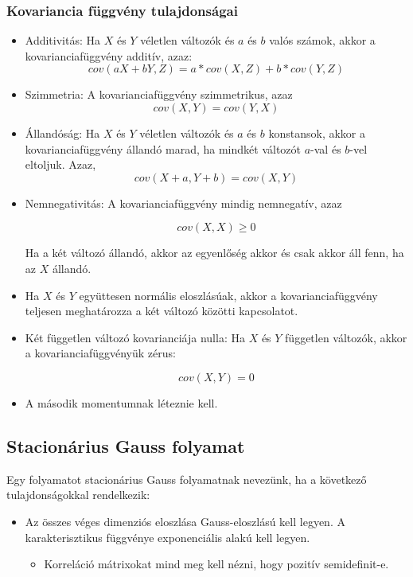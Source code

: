 \documentclass[11pt,a4paper]{article}
\begin{document}
				\subsubsection{Kovariancia függvény tulajdonságai}
					\begin{itemize}
					\item Additivitás: Ha $X$ és $Y$ véletlen változók és $a$ és $b$ valós számok, akkor a kovarianciafüggvény additív, azaz:
					$$cov(aX + bY, Z) = a*cov(X, Z) + b*cov(Y, Z)$$
					
					\item Szimmetria: A kovarianciafüggvény szimmetrikus, azaz
					$$cov(X,Y) = cov(Y,X)$$
					
					\item Állandóság: Ha $X$ és $Y$ véletlen változók és $a$ és $b$ konstansok, akkor a kovarianciafüggvény állandó marad, ha mindkét változót $a$-val és $b$-vel eltoljuk. Azaz,
					$$cov(X + a, Y + b) = cov(X, Y)$$
					
					\item Nemnegativitás: A kovarianciafüggvény mindig nemnegatív, azaz
					
					$$cov(X, X) \ge 0$$
					
					Ha a két változó állandó, akkor az egyenlőség akkor és csak akkor áll fenn, ha az $X$ állandó.
					
					\item Ha $X$ és $Y$ együttesen normális eloszlásúak, akkor a kovarianciafüggvény teljesen meghatározza a két változó közötti kapcsolatot.
					
					\item Két független változó kovarianciája nulla: Ha $X$ és $Y$ független változók, akkor a kovarianciafüggvényük zérus:
					
					$$cov(X, Y) = 0$$

					\item A második momentumnak léteznie kell.
					\end{itemize}
			\subsection{Stacionárius Gauss folyamat}
			Egy folyamatot stacionárius Gauss folyamatnak nevezünk, ha a következő tulajdonságokkal rendelkezik:
			\begin{itemize}
				\item Az összes véges dimenziós eloszlása Gauss-eloszlású kell legyen. A karakterisztikus függvénye exponenciális alakú kell legyen.
				\begin{itemize}
					\item Korreláció mátrixokat mind meg kell nézni, hogy pozitív semidefinit-e.
				\end{itemize}
			\end{itemize}
\end{document}
